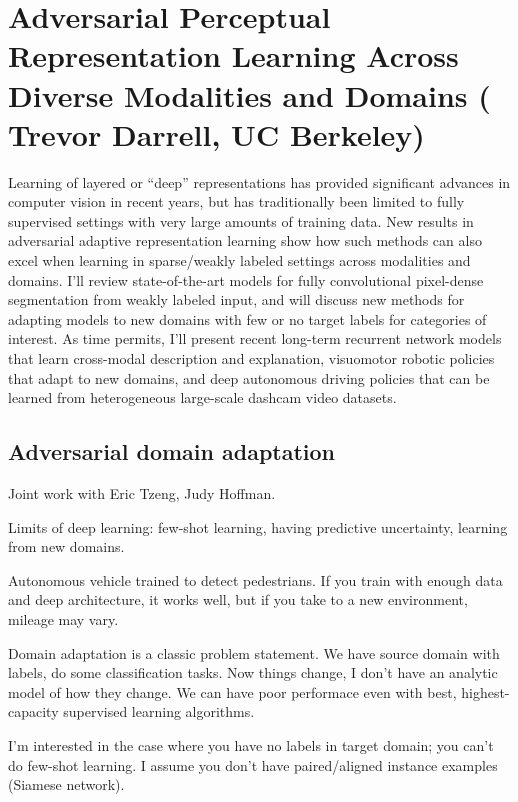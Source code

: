 \section{Adversarial Perceptual Representation Learning Across Diverse Modalities and Domains (
Trevor Darrell, UC Berkeley)}

Learning of layered or ``deep'' representations has provided significant advances in computer vision in recent years, but has traditionally been limited to fully supervised settings with very large amounts of training data.  New results in adversarial adaptive representation learning show how such methods can also excel when learning in sparse/weakly labeled settings across modalities and domains. I'll review state-of-the-art models for fully convolutional pixel-dense segmentation from weakly labeled input, and will discuss new methods for adapting models to new domains with few or no target labels for categories of interest.  As time permits, I'll present recent long-term recurrent network models that learn cross-modal description and explanation, visuomotor robotic policies that adapt to new domains, and deep autonomous driving policies that can be learned from heterogeneous large-scale dashcam video datasets.



\subsection{Adversarial domain adaptation}

Joint work with Eric Tzeng, Judy Hoffman.

Limits of deep learning: few-shot learning, having predictive uncertainty, learning from new domains.

Autonomous vehicle trained to detect pedestrians. If you train with enough data and deep architecture, it works well, but if you take to a new environment, mileage may vary.

Domain adaptation is a classic problem statement. We have source domain with labels, do some classification tasks. Now things change, I don't have an analytic model of how they change. We can have poor performace even with best, highest-capacity supervised learning algorithms.

I'm interested in the case where you have no labels in target domain; you can't do few-shot learning. I assume you don't have paired/aligned instance examples (Siamese network).

